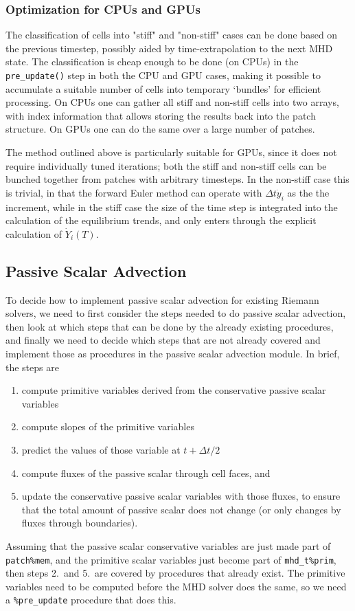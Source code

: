 \documentclass[paper=a4,fontsize=11pt]{scrartcl}
\numberwithin{equation}{section}		%
\numberwithin{figure}{section}			%
\numberwithin{table}{section}				%
\begin{document}
\subsubsection{Optimization for CPUs and GPUs}
The classification of cells into "stiff" and "non-stiff" cases can be done based on the previous timestep, possibly aided by time-extrapolation to the next MHD state.  The classification is cheap enough to be done (on CPUs) in the \verb|pre_update()| step in both the CPU and GPU cases, making it possible to accumulate a suitable number of cells into temporary `bundles' for efficient processing.  On CPUs one can gather all stiff and non-stiff cells into two arrays, with index information that allows storing the results back into the patch structure.  On GPUs one can do the same over a large number of patches.

The method outlined above is particularly suitable for GPUs, since it does not require individually tuned iterations; both the stiff and non-stiff cells can be bunched together from patches with arbitrary timesteps.  In the non-stiff case this is trivial, in that the forward Euler method can operate with $\Delta t \dot{y}_i$ as the the increment, while in the stiff case the size of the time step is integrated into the calculation of the equilibrium trends, and only enters through the explicit calculation of $\dot{Y}_i(T)$.

\subsection{Passive Scalar Advection}
To decide how to implement passive scalar advection for existing Riemann solvers, we need to first consider the steps needed to do passive scalar advection, then look at which steps that can be done by the already existing procedures, and finally we need to decide which steps that are not already covered and implement those as procedures in the passive scalar advection module.  In brief, the steps are
\begin{enumerate}
    \item compute primitive variables derived from the conservative passive scalar variables
    \item compute slopes of the primitive variables
    \item predict the values of those variable at $t+\Delta t/2$
    \item compute fluxes of the passive scalar through cell faces, and
    \item update the conservative passive scalar variables with those fluxes, to ensure that the total amount of passive scalar does not change (or only changes by fluxes through boundaries).
\end{enumerate}
Assuming that the passive scalar conservative variables are just made part of \verb|patch%mem|, and the primitive scalar variables just become part of \verb|mhd_t%prim|, then steps 2.\ and 5.\ are covered by procedures that already exist.  The primitive variables need to be computed before the MHD solver does the same, so we need a \verb|%pre_update| procedure that does this.
\end{document}
